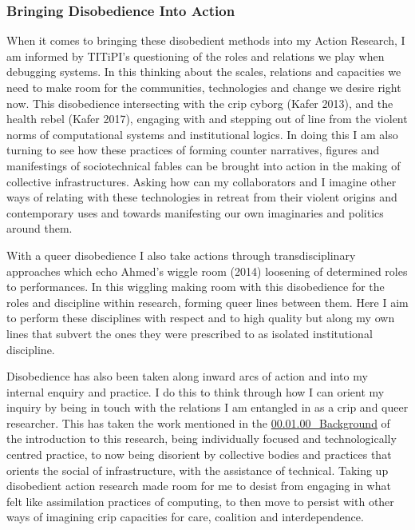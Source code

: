 \hypertarget{bringing-disobedience-into-action-1}{%
\subsubsection{Bringing Disobedience Into
Action}\label{bringing-disobedience-into-action-1}}

When it comes to bringing these disobedient methods into my Action
Research, I am informed by TITiPI's questioning of the roles and
relations we play when debugging systems. In this thinking about the
scales, relations and capacities we need to make room for the
communities, technologies and change we desire right now. This
disobedience intersecting with the crip cyborg (Kafer 2013), and the
health rebel (Kafer 2017), engaging with and stepping out of line from
the violent norms of computational systems and institutional logics. In
doing this I am also turning to see how these practices of forming
counter narratives, figures and manifestings of sociotechnical fables
can be brought into action in the making of collective infrastructures.
Asking how can my collaborators and I imagine other ways of relating
with these technologies in retreat from their violent origins and
contemporary uses and towards manifesting our own imaginaries and
politics around them.

With a queer disobedience I also take actions through transdisciplinary
approaches which echo Ahmed's wiggle room (2014) loosening of determined
roles to performances. In this wiggling making room with this
disobedience for the roles and discipline within research, forming queer
lines between them. Here I aim to perform these disciplines with respect
and to high quality but along my own lines that subvert the ones they
were prescribed to as isolated institutional discipline.

Disobedience has also been taken along inward arcs of action and into my
internal enquiry and practice. I do this to think through how I can
orient my inquiry by being in touch with the relations I am entangled in
as a crip and queer researcher. This has taken the work mentioned in the
\href{../../00_Introduction/sections/00.01.00_Background.md}{00.01.00\_Background}
of the introduction to this research, being individually focused and
technologically centred practice, to now being disorient by collective
bodies and practices that orients the social of infrastructure, with the
assistance of technical. Taking up disobedient action research made room
for me to desist from engaging in what felt like assimilation practices
of computing, to then move to persist with other ways of imagining crip
capacities for care, coalition and interdependence.

